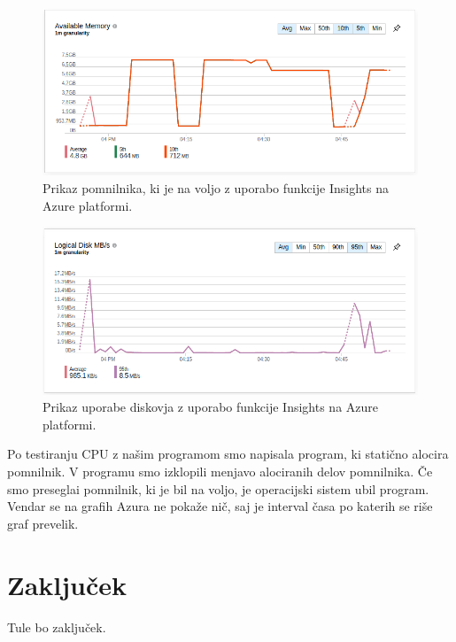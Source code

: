 \begin{figure}[H]
	\centering
	\includegraphics[scale=0.46]{Img/3_ram3.png}
	\caption{Prikaz pomnilnika, ki je na voljo z uporabo funkcije Insights na Azure platformi.}
	\label{fig:3_ram3}
\end{figure}

\begin{figure}[H]
	\centering
	\includegraphics[scale=0.46]{Img/3_ram4.png}
	\caption{Prikaz  uporabe diskovja z uporabo funkcije Insights na Azure platformi.}
	\label{fig:3_ram4}
\end{figure}


Po testiranju CPU z našim programom smo napisala program, ki statično alocira pomnilnik. V programu smo izklopili menjavo alociranih delov pomnilnika. Če smo preseglai pomnilnik, ki je bil na voljo, je operacijski sistem ubil program. Vendar se na grafih Azura ne pokaže nič, saj je interval časa po katerih se riše graf prevelik.


\section{Zaključek}
Tule bo zaključek.

